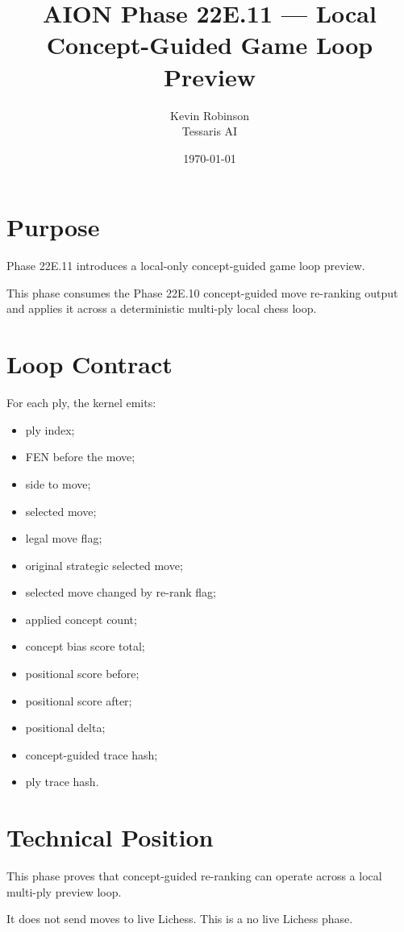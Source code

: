 \documentclass[11pt,a4paper]{article}
\title{\textbf{AION Phase 22E.11 --- Local Concept-Guided Game Loop Preview}}
\author{Kevin Robinson\\Tessaris AI}
\date{\today}
\begin{document}
\maketitle

\section{Purpose}

Phase 22E.11 introduces a local-only concept-guided game loop preview.

This phase consumes the Phase 22E.10 concept-guided move re-ranking output and applies it across a deterministic multi-ply local chess loop.

\section{Loop Contract}

For each ply, the kernel emits:

\begin{itemize}[leftmargin=*]
  \item ply index;
  \item FEN before the move;
  \item side to move;
  \item selected move;
  \item legal move flag;
  \item original strategic selected move;
  \item selected move changed by re-rank flag;
  \item applied concept count;
  \item concept bias score total;
  \item positional score before;
  \item positional score after;
  \item positional delta;
  \item concept-guided trace hash;
  \item ply trace hash.
\end{itemize}

\section{Technical Position}

This phase proves that concept-guided re-ranking can operate across a local multi-ply preview loop.

It does not send moves to live Lichess. This is a no live Lichess phase.
\end{document}
